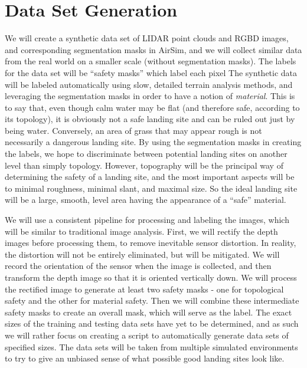 \section{Data Set Generation}
\label{section:dataset_generation}

We will create a synthetic data set of LIDAR point clouds and RGBD images,
and corresponding segmentation masks in AirSim,
and we will collect similar data from the real world on a smaller scale (without segmentation masks).
The labels for the data set will be ``safety masks'' which label each pixel
The synthetic data will be labeled automatically using slow, detailed terrain analysis methods,
and leveraging the segmentation masks in order to have a notion of \textit{material}.
This is to say that, even though calm water may be flat (and therefore safe,
according to its topology),
it is obviously not a safe landing site and can be ruled out just by being water.
Conversely, an area of grass that may appear rough is not necessarily a dangerous landing site.
By using the segmentation masks in creating the labels,
we hope to discriminate between potential landing sites on another level than simply topology.
However, topography will be the principal way of determining the safety of a landing site,
and the most important aspects will be to minimal roughness, minimal slant, and maximal size.
So the ideal landing site will be a large, smooth, level area
having the appearance of a ``safe'' material.

We will use a consistent pipeline for processing and labeling the images,
which will be similar to traditional image analysis.
First, we will rectify the depth images before processing them,
to remove inevitable sensor distortion.
In reality, the distortion will not be entirely eliminated, but will be mitigated.
We will record the orientation of the sensor when the image is collected,
and then transform the depth image so that it is oriented vertically down.
We will process the rectified image to generate at least two safety masks -
one for topological safety and the other for material safety.
Then we will combine these intermediate safety masks to create an overall mask,
which will serve as the label.
The exact sizes of the training and testing data sets have yet to be determined, and as such we will rather focus
on creating a script to automatically generate data sets of specified sizes.
The data sets will be taken from multiple simulated environments to try to give an unbiased
sense of what possible good landing sites look like.

